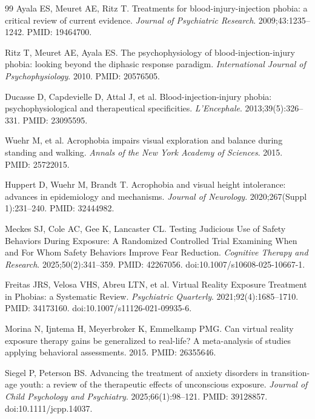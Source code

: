 \documentclass[11pt]{article}
\begin{document}
\begin{thebibliography}{99}
Ayala ES, Meuret AE, Ritz T. Treatments for blood-injury-injection phobia: a critical review of current evidence. \textit{Journal of Psychiatric Research}. 2009;43:1235--1242. PMID: 19464700.

Ritz T, Meuret AE, Ayala ES. The psychophysiology of blood-injection-injury phobia: looking beyond the diphasic response paradigm. \textit{International Journal of Psychophysiology}. 2010. PMID: 20576505.

Ducasse D, Capdevielle D, Attal J, et al. Blood-injection-injury phobia: psychophysiological and therapeutical specificities. \textit{L'Encephale}. 2013;39(5):326--331. PMID: 23095595.

Wuehr M, et al. Acrophobia impairs visual exploration and balance during standing and walking. \textit{Annals of the New York Academy of Sciences}. 2015. PMID: 25722015.

Huppert D, Wuehr M, Brandt T. Acrophobia and visual height intolerance: advances in epidemiology and mechanisms. \textit{Journal of Neurology}. 2020;267(Suppl 1):231--240. PMID: 32444982.

Meckes SJ, Cole AC, Gee K, Lancaster CL. Testing Judicious Use of Safety Behaviors During Exposure: A Randomized Controlled Trial Examining When and For Whom Safety Behaviors Improve Fear Reduction. \textit{Cognitive Therapy and Research}. 2025;50(2):341--359. PMID: 42267056. doi:10.1007/s10608-025-10667-1.

Freitas JRS, Velosa VHS, Abreu LTN, et al. Virtual Reality Exposure Treatment in Phobias: a Systematic Review. \textit{Psychiatric Quarterly}. 2021;92(4):1685--1710. PMID: 34173160. doi:10.1007/s11126-021-09935-6.

Morina N, Ijntema H, Meyerbroker K, Emmelkamp PMG. Can virtual reality exposure therapy gains be generalized to real-life? A meta-analysis of studies applying behavioral assessments. 2015. PMID: 26355646.

Siegel P, Peterson BS. Advancing the treatment of anxiety disorders in transition-age youth: a review of the therapeutic effects of unconscious exposure. \textit{Journal of Child Psychology and Psychiatry}. 2025;66(1):98--121. PMID: 39128857. doi:10.1111/jcpp.14037.

\end{thebibliography}

\appendix
\end{document}
